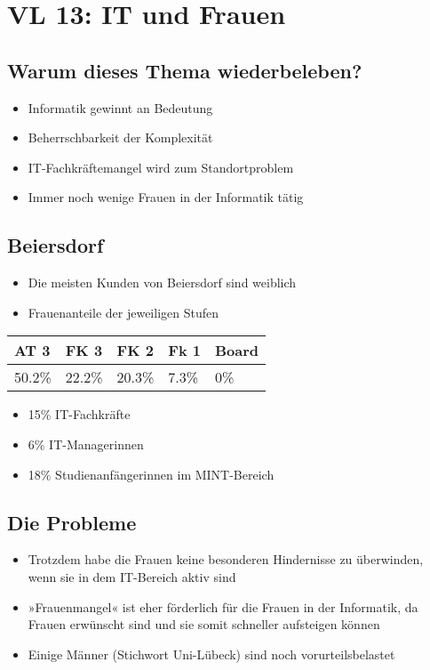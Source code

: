 \section{VL 13: IT und Frauen}


\subsection{Warum dieses Thema wiederbeleben?}

\begin{itemize}
	\item Informatik gewinnt an Bedeutung
	\item Beherrschbarkeit der Komplexität
	\item IT-Fachkräftemangel wird zum Standortproblem
	\item Immer noch wenige Frauen in der Informatik tätig
\end{itemize}


\subsection{Beiersdorf}

\begin{itemize}
	\item Die meisten Kunden von Beiersdorf sind weiblich
	\item Frauenanteile der jeweiligen Stufen
\end{itemize}

\begin{tabularx}{0.6\textwidth}{|X|X|X|X|X|} \hline
	AT 3   & FK 3   & FK 2   & Fk 1  & Board \\\hline
	50.2\% & 22.2\% & 20.3\% & 7.3\% & 0\% \\\hline
\end{tabularx}

\begin{itemize}
	\item 15\% IT-Fachkräfte
	\item 6\% IT-Managerinnen
	\item 18\% Studienanfängerinnen im MINT-Bereich
\end{itemize}


\subsection{Die Probleme}

\begin{itemize}
	\item Trotzdem habe die Frauen keine besonderen Hindernisse zu überwinden, wenn sie in dem IT-Bereich aktiv sind
	\item »Frauenmangel« ist eher förderlich für die Frauen in der Informatik, da Frauen erwünscht sind und sie somit schneller aufsteigen können
	\item Einige Männer (Stichwort Uni-Lübeck) sind noch vorurteilsbelastet
\end{itemize}